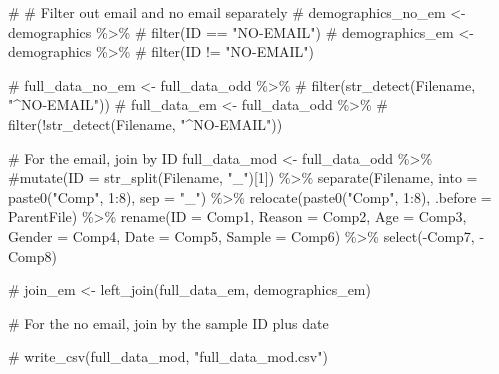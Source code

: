 \documentclass[
  letterpaper,
  DIV=11,
  numbers=noendperiod]{scrartcl}
\newenvironment{Shaded}{\begin{snugshade}}{\end{snugshade}}
\newcommand{\AttributeTok}[1]{\textcolor[rgb]{0.40,0.45,0.13}{#1}}
\newcommand{\CommentTok}[1]{\textcolor[rgb]{0.37,0.37,0.37}{#1}}
\newcommand{\DecValTok}[1]{\textcolor[rgb]{0.68,0.00,0.00}{#1}}
\newcommand{\FunctionTok}[1]{\textcolor[rgb]{0.28,0.35,0.67}{#1}}
\newcommand{\NormalTok}[1]{\textcolor[rgb]{0.00,0.23,0.31}{#1}}
\newcommand{\OtherTok}[1]{\textcolor[rgb]{0.00,0.23,0.31}{#1}}
\newcommand{\SpecialCharTok}[1]{\textcolor[rgb]{0.37,0.37,0.37}{#1}}
\newcommand{\StringTok}[1]{\textcolor[rgb]{0.13,0.47,0.30}{#1}}
\begin{document}
\begin{Shaded}
\begin{Highlighting}[]
\CommentTok{\# \# Filter out email and no email separately }
\CommentTok{\# demographics\_no\_em \textless{}{-} demographics \%\textgreater{}\%}
\CommentTok{\#   filter(ID == "NO{-}EMAIL")}
\CommentTok{\# demographics\_em \textless{}{-} demographics \%\textgreater{}\%}
\CommentTok{\#   filter(ID != "NO{-}EMAIL")}

\CommentTok{\# full\_data\_no\_em \textless{}{-} full\_data\_odd \%\textgreater{}\%}
\CommentTok{\#   filter(str\_detect(Filename, "\^{}NO{-}EMAIL"))}
\CommentTok{\# full\_data\_em \textless{}{-} full\_data\_odd \%\textgreater{}\%}
\CommentTok{\#   filter(!str\_detect(Filename, "\^{}NO{-}EMAIL"))}

\CommentTok{\# For the email, join by ID}
\NormalTok{full\_data\_mod }\OtherTok{\textless{}{-}}\NormalTok{ full\_data\_odd }\SpecialCharTok{\%\textgreater{}\%}
  \CommentTok{\#mutate(ID = str\_split(Filename, "\_")[1]) \%\textgreater{}\%}
  \FunctionTok{separate}\NormalTok{(Filename, }\AttributeTok{into =} \FunctionTok{paste0}\NormalTok{(}\StringTok{"Comp"}\NormalTok{, }\DecValTok{1}\SpecialCharTok{:}\DecValTok{8}\NormalTok{), }\AttributeTok{sep =} \StringTok{"\_"}\NormalTok{) }\SpecialCharTok{\%\textgreater{}\%}
  \FunctionTok{relocate}\NormalTok{(}\FunctionTok{paste0}\NormalTok{(}\StringTok{"Comp"}\NormalTok{, }\DecValTok{1}\SpecialCharTok{:}\DecValTok{8}\NormalTok{), }\AttributeTok{.before =}\NormalTok{ ParentFile) }\SpecialCharTok{\%\textgreater{}\%}
  \FunctionTok{rename}\NormalTok{(}\AttributeTok{ID =} \StringTok{\textasciigrave{}}\AttributeTok{Comp1}\StringTok{\textasciigrave{}}\NormalTok{, }\AttributeTok{Reason =}\NormalTok{ Comp2, }\AttributeTok{Age =}\NormalTok{ Comp3, }\AttributeTok{Gender =}\NormalTok{ Comp4, }\AttributeTok{Date =}\NormalTok{ Comp5, }\AttributeTok{Sample =}\NormalTok{ Comp6) }\SpecialCharTok{\%\textgreater{}\%}
  \FunctionTok{select}\NormalTok{(}\SpecialCharTok{{-}}\NormalTok{Comp7, }\SpecialCharTok{{-}}\NormalTok{Comp8)}

\CommentTok{\# join\_em \textless{}{-} left\_join(full\_data\_em, demographics\_em)}

\CommentTok{\# For the no email, join by the sample ID plus date}
\end{Highlighting}
\end{Shaded}

\begin{Shaded}
\begin{Highlighting}[]
\CommentTok{\# write\_csv(full\_data\_mod, "full\_data\_mod.csv")}
\end{Highlighting}
\end{Shaded}
\end{document}
